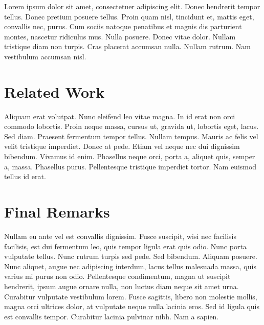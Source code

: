\documentclass[conference]{IEEEtran}
\begin{document}
Lorem ipsum dolor sit amet, consectetuer adipiscing elit. Donec hendrerit tempor
tellus. Donec pretium posuere tellus. Proin quam nisl, tincidunt et, mattis
eget, convallis nec, purus. Cum sociis natoque penatibus et magnis dis
parturient montes, nascetur ridiculus mus. Nulla posuere. Donec vitae dolor.
Nullam tristique diam non turpis. Cras placerat accumsan nulla. Nullam rutrum.
Nam vestibulum accumsan nisl.
\section{Related Work}

Aliquam erat volutpat. Nunc eleifend leo vitae magna. In id erat non orci
commodo lobortis. Proin neque massa, cursus ut, gravida ut, lobortis eget,
lacus. Sed diam. Praesent fermentum tempor tellus. Nullam tempus. Mauris ac
felis vel velit tristique imperdiet. Donec at pede. Etiam vel neque nec dui
dignissim bibendum. Vivamus id enim. Phasellus neque orci, porta a, aliquet
quis, semper a, massa. Phasellus purus. Pellentesque tristique imperdiet tortor.
Nam euismod tellus id erat.
\section{Final Remarks}

Nullam eu ante vel est convallis dignissim. Fusce suscipit, wisi nec facilisis
facilisis, est dui fermentum leo, quis tempor ligula erat quis odio. Nunc porta
vulputate tellus. Nunc rutrum turpis sed pede. Sed bibendum. Aliquam posuere.
Nunc aliquet, augue nec adipiscing interdum, lacus tellus malesuada massa, quis
varius mi purus non odio. Pellentesque condimentum, magna ut suscipit hendrerit,
ipsum augue ornare nulla, non luctus diam neque sit amet urna. Curabitur
vulputate vestibulum lorem. Fusce sagittis, libero non molestie mollis, magna
orci ultrices dolor, at vulputate neque nulla lacinia eros. Sed id ligula quis
est convallis tempor. Curabitur lacinia pulvinar nibh. Nam a sapien.



\end{document}
